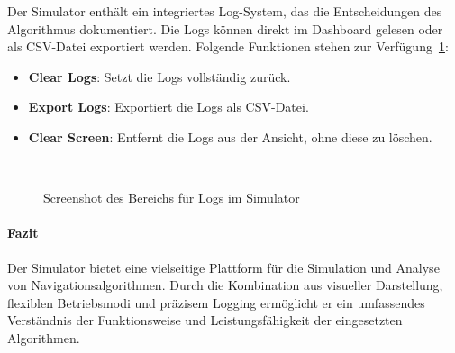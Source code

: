 \documentclass[main.tex]{subfiles} %
\begin{document}
Der Simulator enthält ein integriertes Log-System, das die
Entscheidungen des Algorithmus dokumentiert. Die Logs können direkt
im Dashboard gelesen oder als CSV-Datei exportiert werden. Folgende
Funktionen stehen zur Verfügung~\ref{fig:DashboardLogs}:

\begin{itemize}
  \item \textbf{Clear Logs}:
    Setzt die Logs vollständig zurück.

  \item \textbf{Export Logs}:
    Exportiert die Logs als CSV-Datei.

  \item \textbf{Clear Screen}:
    Entfernt die Logs aus der Ansicht, ohne diese zu löschen.
\end{itemize}

\begin{figure}[H]
  \centering
  \caption{Screenshot des Bereichs für Logs im Simulator}~\label{fig:DashboardLogs}
\end{figure}

\paragraph{Fazit}

Der Simulator bietet eine vielseitige Plattform für die Simulation
und Analyse von Navigationsalgorithmen. Durch die Kombination aus
visueller Darstellung, flexiblen Betriebsmodi und präzisem Logging
ermöglicht er ein umfassendes Verständnis der Funktionsweise und
Leistungsfähigkeit der eingesetzten Algorithmen.
\end{document}
